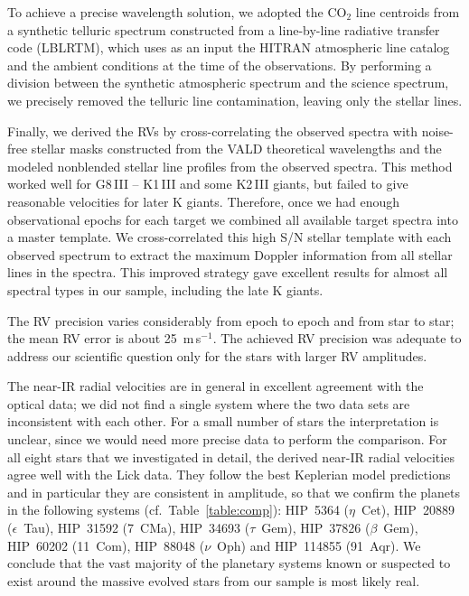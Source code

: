 \documentclass{aa}
\begin{document}
To achieve a precise wavelength solution, we adopted the CO$_2$ line centroids 
from a synthetic telluric spectrum constructed from a line-by-line radiative transfer code (LBLRTM), 
which uses as an input the HITRAN atmospheric line catalog and the ambient conditions at the time of the observations.
By performing a division between the synthetic atmospheric spectrum and the science spectrum, we precisely removed the telluric line
contamination, leaving only the stellar lines.



Finally, we derived the RVs by cross-correlating the observed spectra with noise-free stellar masks constructed from the 
VALD theoretical wavelengths and the modeled nonblended stellar line profiles from the observed spectra.
This method worked well for G8\,III -- K1\,III and some K2\,III giants, but failed to give reasonable velocities for later K giants. 
Therefore, once we had enough observational epochs for each target we combined all available target spectra into a master template. 
We cross-correlated this high S/N stellar template with each observed spectrum
 to extract the maximum Doppler information from all stellar lines in the spectra.
This improved strategy gave excellent results for almost all spectral types in our sample, including the late K giants.


The RV precision varies considerably from epoch to epoch and from star to star; the mean RV error is about 25~m\,s$^{-1}$.
The achieved RV precision was adequate to address our scientific question only for the stars with larger RV amplitudes. 



The near-IR radial velocities are in general in excellent agreement with the optical
data; we did not find a single system where the two data sets are inconsistent with each other.
For a small number of stars the interpretation is unclear, since we would need more precise data to perform the comparison.
For all eight stars that we investigated in detail, the derived near-IR radial velocities agree well with the Lick data. 
They follow the best Keplerian model predictions and in particular they are consistent in amplitude,
so that we confirm the planets in the following systems (cf.~Table~\ref{table:comp}):
HIP~5364 ($\eta$~Cet), HIP~20889 ($\epsilon$~Tau), HIP~31592 (7~CMa), HIP~34693 ($\tau$~Gem), 
HIP~37826 ($\beta$~Gem), HIP~60202 (11~Com), HIP~88048 ($\nu$~Oph) and HIP~114855 (91~Aqr).
We conclude that the vast majority of the planetary systems known or suspected to exist around the 
massive evolved stars from our sample is most likely real.
  
\end{document}
